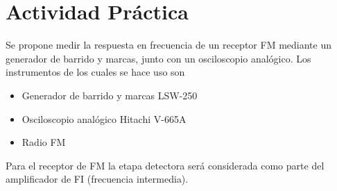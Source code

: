   \pagebreak
  \section{Actividad Práctica}
    Se propone medir la respuesta en frecuencia de un receptor FM mediante un generador de barrido y marcas, junto
    con un osciloscopio analógico. Los instrumentos de los cuales se hace uso son

    \begin{itemize}
      \item Generador de barrido y marcas LSW-250
      \item Osciloscopio analógico Hitachi V-665A
      \item Radio FM
    \end{itemize}

    Para el receptor de FM la etapa detectora será considerada como parte del amplificador de FI (frecuencia intermedia).
    
    
    
    
